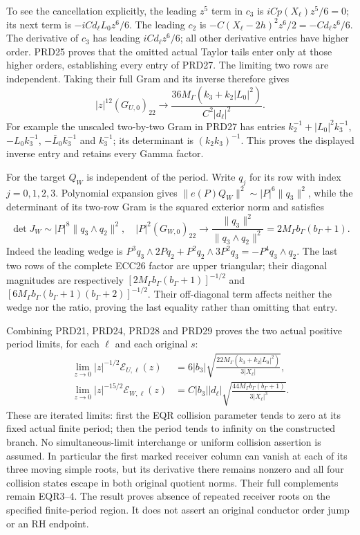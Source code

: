 To see the cancellation explicitly, the leading $z^5$ term in
$c_3$ is $iCp(X_\ell)z^5/6=0$; its next term is
$-iCd_\ell L_0z^6/6$. The leading $c_2$ is
$-C(X_\ell-2h)^2z^6/2=-Cd_\ell z^6/6$.
The derivative of $c_3$ has leading $iCd_\ell z^6/6$;
all other derivative entries have higher order. PRD25 proves
that the omitted actual Taylor tails enter only at those higher
orders, establishing every entry of PRD27.
The limiting two rows are independent. Taking their full Gram
and its inverse therefore gives
\[
 |z|^{12}(G_{U,0})_{22}\longrightarrow
 \frac{36M_\Gamma(k_3+k_2|L_0|^2)}{C^2|d_\ell|^2}.
 \tag{PRD28}
\]
For example the unscaled two-by-two Gram in PRD27 has entries
$k_2^{-1}+|L_0|^2k_3^{-1}$, $-L_0k_3^{-1}$,
$-\bar L_0k_3^{-1}$ and $k_3^{-1}$; its determinant is
$(k_2k_3)^{-1}$. This proves the displayed inverse entry and
retains every Gamma factor.

For the target $Q_W$ is independent of the period. Write $q_j$
for its row with index $j=0,1,2,3$. Polynomial expansion gives
$\|e(P)Q_W\|^2\sim|P|^6\|q_3\|^2$, while the determinant
of its two-row Gram is the squared exterior norm and satisfies
\[
 \det J_W\sim |P|^8\|q_3\wedge q_2\|^2,
 \quad
 |P|^2(G_{W,0})_{22}\longrightarrow
       \frac{\|q_3\|^2}{\|q_3\wedge q_2\|^2}
       =2M_\Gamma b_\Gamma(b_\Gamma+1).
 \tag{PRD29}
\]
Indeed the leading wedge is
$P^3q_3\wedge2Pq_2+P^2q_2\wedge3P^2q_3
=-P^4q_3\wedge q_2$.
The last two rows of the complete ECC26 factor are upper triangular;
their diagonal magnitudes are respectively
$[2M_\Gamma b_\Gamma(b_\Gamma+1)]^{-1/2}$ and
$[6M_\Gamma b_\Gamma(b_\Gamma+1)(b_\Gamma+2)]^{-1/2}$.
Their off-diagonal term affects neither the wedge nor the ratio,
proving the last equality rather than omitting that entry.

Combining PRD21, PRD24, PRD28 and PRD29 proves the two actual
positive period limits, for each $\ell$ and each original $s$:
\[
\begin{split}
 \lim_{z\to0}|z|^{-1/2}\mathcal E_{U,\ell}(z)
 &=6|b_3|\sqrt{\frac{22M_\Gamma(k_3+k_2|L_0|^2)}{3|X_\ell|}},\\
 \lim_{z\to0}|z|^{-15/2}\mathcal E_{W,\ell}(z)
 &=C|b_3||d_\ell|
     \sqrt{\frac{44M_\Gamma b_\Gamma(b_\Gamma+1)}
                         {3|X_\ell|^3}}.
\end{split}\tag{PRD30}
\]
These are iterated limits: first the EQR collision parameter tends
to zero at its fixed actual finite period; then the period tends
to infinity on the constructed branch. No simultaneous-limit
interchange or uniform collision assertion is assumed.
In particular the first marked receiver column can vanish at
each of its three moving simple roots, but its derivative there
remains nonzero and all four collision states escape in both
original quotient norms. Their full complements remain EQR3--4.
The result proves absence of repeated receiver roots on the
specified finite-period region. It does not assert an original
conductor order jump or an RH endpoint.

